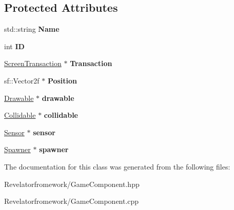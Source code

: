 \subsection*{Protected Attributes}
\begin{DoxyCompactItemize}
\item 
\hypertarget{class_game_component_ab1037207fec65ac5fe65dec1e22f0566}{std\-::string {\bfseries Name}}\label{class_game_component_ab1037207fec65ac5fe65dec1e22f0566}

\item 
\hypertarget{class_game_component_ac8d794e78280785eb956eaff044f74b2}{int {\bfseries I\-D}}\label{class_game_component_ac8d794e78280785eb956eaff044f74b2}

\item 
\hypertarget{class_game_component_ae8c59f47f6723d108eb481a160607e98}{\hyperlink{class_screen_transaction}{Screen\-Transaction} $\ast$ {\bfseries Transaction}}\label{class_game_component_ae8c59f47f6723d108eb481a160607e98}

\item 
\hypertarget{class_game_component_acc3109bb4ae36112eb8796e067160c59}{sf\-::\-Vector2f $\ast$ {\bfseries Position}}\label{class_game_component_acc3109bb4ae36112eb8796e067160c59}

\item 
\hypertarget{class_game_component_acb73190345f4933825e9c8b8d5030438}{\hyperlink{class_drawable}{Drawable} $\ast$ {\bfseries drawable}}\label{class_game_component_acb73190345f4933825e9c8b8d5030438}

\item 
\hypertarget{class_game_component_aa91bd3600bd5964b55c7806dcfd1c862}{\hyperlink{class_collidable}{Collidable} $\ast$ {\bfseries collidable}}\label{class_game_component_aa91bd3600bd5964b55c7806dcfd1c862}

\item 
\hypertarget{class_game_component_ad585bf57df228afc83fbf777142e51bd}{\hyperlink{class_sensor}{Sensor} $\ast$ {\bfseries sensor}}\label{class_game_component_ad585bf57df228afc83fbf777142e51bd}

\item 
\hypertarget{class_game_component_a15caaab21ec2e8eb9d438a25afbef4da}{\hyperlink{class_spawner}{Spawner} $\ast$ {\bfseries spawner}}\label{class_game_component_a15caaab21ec2e8eb9d438a25afbef4da}

\end{DoxyCompactItemize}


The documentation for this class was generated from the following files\-:\begin{DoxyCompactItemize}
\item 
Revelatorfromework/Game\-Component.\-hpp\item 
Revelatorfromework/Game\-Component.\-cpp\end{DoxyCompactItemize}
